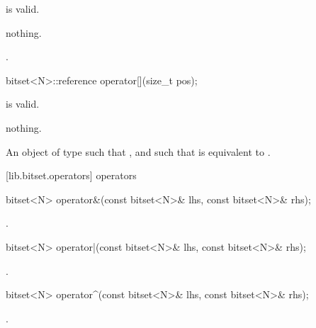 \begin{itemdescr}
\pnum
\requires
{} is valid.

\pnum
\throws nothing.

\pnum
\returns
{}.
\end{itemdescr}

\begin{itemdecl}
bitset<N>::reference operator[](size_t pos);
\end{itemdecl}

\begin{itemdescr}
\pnum
\requires
{} is valid.

\pnum
\throws nothing.

\pnum
\returns
An object of type
such that
,
and such that
is equivalent to
.
\end{itemdescr}

[lib.bitset.operators]{ operators}

%
\begin{itemdecl}
bitset<N> operator&(const bitset<N>& lhs, const bitset<N>& rhs);
\end{itemdecl}

\begin{itemdescr}
\pnum
\returns
{}.
\end{itemdescr}

%
\begin{itemdecl}
bitset<N> operator|(const bitset<N>& lhs, const bitset<N>& rhs);
\end{itemdecl}

\begin{itemdescr}
\pnum
\returns
{}.
\end{itemdescr}

%
\begin{itemdecl}
bitset<N> operator^(const bitset<N>& lhs, const bitset<N>& rhs);
\end{itemdecl}

\begin{itemdescr}
\pnum
\returns
{}.
\end{itemdescr}


